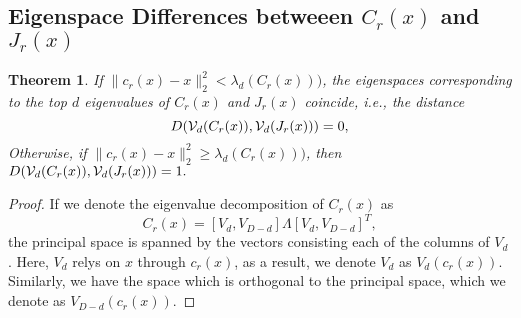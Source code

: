 \documentclass[aos,preprint]{imsart}
\newtheorem{theorem}{Theorem}[section]
\theoremstyle{remark}
\begin{document}
\begin{appendix}
\section{}
\subsection{Eigenspace Differences betweeen $C_r(x)$ and $J_r(x)$}
\begin{theorem}
If $\|c_r(x)-x\|_2^2< \lambda_d(C_r(x)))$, the eigenspaces corresponding to the top $d$ eigenvalues of $C_r(x)$ and $J_r(x)$ coincide, i.e., the distance 
\[
D({\cal V}_d (C_r(x)), {\cal V}_d (J_r(x)))=0,
\]
Otherwise, if $\|c_r(x)-x\|_2^2\geq \lambda_d(C_r(x)))$, then 
$
D({\cal V}_d (C_r(x)),{\cal V}_d (J_r(x)))=1.
$
\end{theorem}
\begin{proof}

If we denote the eigenvalue decomposition of $C_r(x)$ as 
\[
C_r(x) = [ V_d, V_{D-d}] \Lambda [ V_d, V_{D-d}]^T,
\]
the principal space is spanned by the vectors consisting each of the columns of $V_d$. Here, $V_d$ relys on $x$ through $c_r(x)$, as a result, we denote $V_d$ as $V_d(c_r(x))$. Similarly, we have the space which is orthogonal to the principal space, which we denote as $V_{D-d}(c_r(x))$.


\end{proof}
\end{appendix}
\end{document}
